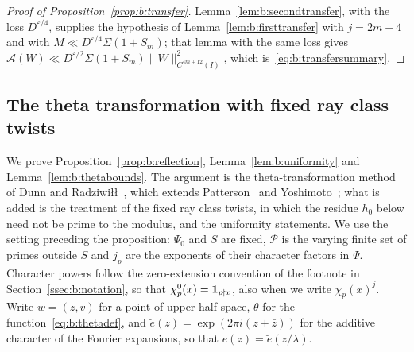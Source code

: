 \begin{proof}[Proof of Proposition~\ref{prop:b:transfer}]
Lemma~\ref{lem:b:secondtransfer}, with the loss $D^{\varepsilon/4}$, supplies the hypothesis of Lemma~\ref{lem:b:firsttransfer} with $j=2m+4$ and with $M\ll D^{\varepsilon/4}\Sigma(1+S_m)$; that lemma with the same loss gives $\mathcal A(W)\ll D^{\varepsilon/2}\Sigma(1+S_m)\|W\|^2_{C^{4m+12}(I)}$, which is~\eqref{eq:b:transfersummary}.
\end{proof}

\subsection{The theta transformation with fixed ray class twists}\label{ssec:b:fixedray}

We prove Proposition~\ref{prop:b:reflection}, Lemma~\ref{lem:b:uniformity} and Lemma~\ref{lem:b:thetabounds}. The argument is the theta-transformation method of Dunn and Radziwi\l\l~\cite[\S5 and Appendix~A]{DR}, which extends Patterson~\cite{Pat77} and Yoshimoto~\cite{Yos87}; what is added is the treatment of the fixed ray class twists, in which the residue $h_0$ below need not be prime to the modulus, and the uniformity statements. We use the setting preceding the proposition: $\Psi_0$ and $S$ are fixed, $\mathcal P$ is the varying finite set of primes outside $S$ and $j_p$ are the exponents of their character factors in $\Psi$. Character powers follow the zero-extension convention of the footnote in Section~\ref{ssec:b:notation}, so that $\chi_p^0(x)=\mathbf{1}_{p\nmid x}$, also when we write $\chi_p(x)^j$. Write $w=(z,v)$ for a point of upper half-space, $\theta$ for the function~\eqref{eq:b:thetadef}, and $\breve e(z)=\exp(2\pi i(z+\bar z))$ for the additive character of the Fourier expansions, so that $e(z)=\breve e(z/\lambda)$.

